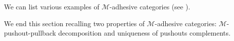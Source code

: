\documentclass[a4paper,UKenglish,cleveref,pdftex, thm-restate,numberwithinsect]{lipics}
\begin{document}
We can list various examples of $\mathcal{M}$-adhesive categories (see \cite{castelnovo2023thesis,CastelnovoGM22,lack2006toposes}).

\begin{example}
\end{example}

\begin{example}
\end{example}


\begin{example}
\end{example}

\begin{example}
\end{example}

We end this section recalling two properties of $\mathcal{M}$-adhesive categories:  $\mathcal{M}$-pushout-pullback decomposition and uniqueness of pushouts complements.
\end{document}
